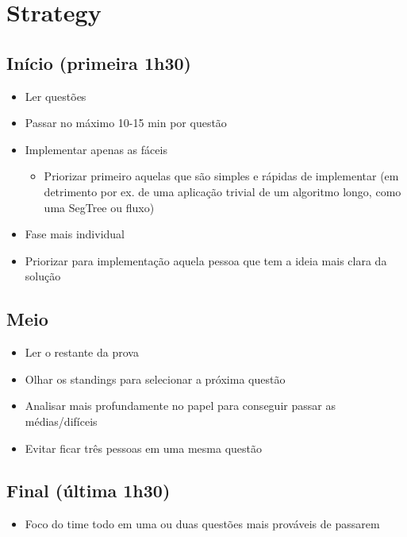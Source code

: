 \section{Strategy}

\subsection{Início (primeira 1h30)}

\begin{itemize}
	\item Ler questões
	\item Passar no máximo 10-15 min por questão
	\item Implementar apenas as fáceis
	\begin{itemize}
		\item Priorizar primeiro aquelas que são simples e rápidas de implementar
		(em detrimento por ex. de uma aplicação trivial de um algoritmo longo, como uma SegTree ou fluxo)
	\end{itemize}
	\item Fase mais individual
	\item Priorizar para implementação aquela pessoa que tem a ideia mais clara da solução
\end{itemize}

\subsection{Meio}

\begin{itemize}
	\item Ler o restante da prova
	\item Olhar os standings para selecionar a próxima questão
	\item Analisar mais profundamente no papel para conseguir passar as médias/difíceis
	\item Evitar ficar três pessoas em uma mesma questão
\end{itemize}

\subsection{Final (última 1h30)}

\begin{itemize}
	\item Foco do time todo em uma ou duas questões mais prováveis de passarem
\end{itemize}
